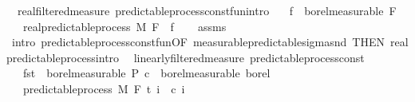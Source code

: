 \begin{isabellebody}
\endisatagproof
{\isafoldproof}%
%
\isadelimproof
\isanewline
%
\endisadelimproof
\isanewline
{}\isamarkupfalse%
\ {\isacharparenleft}{\kern0pt}\ real{\isacharunderscore}{\kern0pt}filtered{\isacharunderscore}{\kern0pt}measure{\isacharparenright}{\kern0pt}\ predictable{\isacharunderscore}{\kern0pt}process{\isacharunderscore}{\kern0pt}const{\isacharunderscore}{\kern0pt}fun{\isacharprime}{\kern0pt}{\isacharbrackleft}{\kern0pt}intro{\isacharbrackright}{\kern0pt}{\isacharcolon}{\kern0pt}\isanewline
\ \ \ {\isachardoublequoteopen}f\ {\isasymin}\ borel{\isacharunderscore}{\kern0pt}measurable\ {\isacharparenleft}{\kern0pt}F\ {}{\isacharparenright}{\kern0pt}{\isachardoublequoteclose}\isanewline
\ \ \ {\isachardoublequoteopen}real{\isacharunderscore}{\kern0pt}predictable{\isacharunderscore}{\kern0pt}process\ M\ F\ {\isacharparenleft}{\kern0pt}{\isasymlambda}{\isacharunderscore}{\kern0pt}{\isachardot}{\kern0pt}\ f{\isacharparenright}{\kern0pt}{\isachardoublequoteclose}\isanewline
%
\isadelimproof
\ \ %
\endisadelimproof
%
\isatagproof
{}\isamarkupfalse%
\ assms\ \isamarkupfalse%
\ {\isacharparenleft}{\kern0pt}intro\ predictable{\isacharunderscore}{\kern0pt}process{\isacharunderscore}{\kern0pt}const{\isacharunderscore}{\kern0pt}fun{\isacharbrackleft}{\kern0pt}OF\ measurable{\isacharunderscore}{\kern0pt}predictable{\isacharunderscore}{\kern0pt}sigma{\isacharunderscore}{\kern0pt}snd{\isacharprime}{\kern0pt}{\isacharcomma}{\kern0pt}\ THEN\ real{\isacharunderscore}{\kern0pt}predictable{\isacharunderscore}{\kern0pt}process{\isachardot}{\kern0pt}intro{\isacharbrackright}{\kern0pt}{\isacharparenright}{\kern0pt}%
\endisatagproof
{\isafoldproof}%
%
\isadelimproof
\isanewline
%
\endisadelimproof
\isanewline
{}\isamarkupfalse%
\ {\isacharparenleft}{\kern0pt}\ linearly{\isacharunderscore}{\kern0pt}filtered{\isacharunderscore}{\kern0pt}measure{\isacharparenright}{\kern0pt}\ predictable{\isacharunderscore}{\kern0pt}process{\isacharunderscore}{\kern0pt}const{\isacharcolon}{\kern0pt}\isanewline
\ \ \ {\isachardoublequoteopen}fst\ {\isasymin}\ borel{\isacharunderscore}{\kern0pt}measurable\ {\isasymSigma}\isactrlsub P{\isachardoublequoteclose}\ {\isachardoublequoteopen}c\ {\isasymin}\ borel{\isacharunderscore}{\kern0pt}measurable\ borel{\isachardoublequoteclose}\isanewline
\ \ \ {\isachardoublequoteopen}predictable{\isacharunderscore}{\kern0pt}process\ M\ F\ t\ {\isacharparenleft}{\kern0pt}{\isasymlambda}i\ {\isacharunderscore}{\kern0pt}{\isachardot}{\kern0pt}\ c\ i{\isacharparenright}{\kern0pt}{\isachardoublequoteclose}\isanewline

\end{isabellebody}
